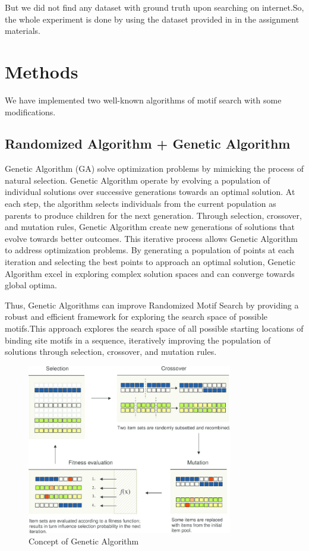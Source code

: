 \documentclass{article}
\begin{document}
\begin{Large}
But we did not find any dataset with ground truth upon searching on internet.So, the whole experiment is done by using the dataset provided in in the assignment materials.

\section{Methods}
We have implemented two well-known algorithms of motif search with some modifications.
\subsection{Randomized Algorithm + Genetic Algorithm}
Genetic Algorithm (GA) solve optimization problems by mimicking the process of natural selection. Genetic Algorithm  operate by evolving a population of individual solutions over successive generations towards an optimal solution. At each step, the algorithm selects individuals from the current population as parents to produce children for the next generation. Through selection, crossover, and mutation rules, Genetic Algorithm create new generations of solutions that evolve towards better outcomes. This iterative process allows Genetic Algorithm  to address optimization problems. By generating a population of points at each iteration and selecting the best points to approach an optimal solution, Genetic Algorithm excel in exploring complex solution spaces and can converge towards global optima.

Thus, Genetic Algorithms can improve Randomized Motif Search by providing a robust and efficient framework for exploring the search space of possible motifs.This approach explores the search space of all possible starting locations of binding site motifs in a sequence, iteratively improving the population of solutions through selection, crossover, and mutation rules.
\begin{figure}[h]
    \centering
    \includegraphics[width=0.8\textwidth]{methods/genetic-algorithm.png}
    \caption{Concept of Genetic Algorithm}
\end{figure}


\end{Large}
\end{document}
